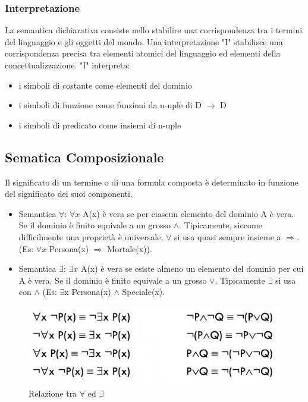 \documentclass{article}
\begin{document}
\subsubsection{Interpretazione}
La semantica dichiarativa consiste nello stabilire una corrispondenza tra i termini del linguaggio e gli oggetti del mondo. \newline
Una interpretazione "I" stabilisce una corrispondenza precisa tra elementi atomici del linguaggio ed elementi della concettualizzazione. "I" interpreta:
\begin{itemize}
    \item i simboli di costante come elementi del dominio
    \item i simboli di funzione come funzioni da n-uple di D $\rightarrow$ D
    \item i simboli di predicato come insiemi di n-uple
\end{itemize}

\subsection{Sematica Composizionale}
Il significato di un termine o di una formula composta è determinato in funzione del significato dei suoi componenti.
\begin{itemize}
    \item Semantica $\forall$:  $\forall x$ A(x) è vera se per ciascun elemento del dominio A è vera. Se il dominio è finito equivale a un grosso $\land$. Tipicamente, siccome difficilmente una proprietà è universale, $\forall$ si usa quasi sempre insieme a $\Rightarrow$. (Es: $\forall x$ Persona(x) $\Rightarrow$ Mortale(x)).
    \item Semantica $\exists$: $\exists x$ A(x) è vera se esiste almeno un elemento del dominio per cui A è vera. Se il dominio è finito equivale a un grosso $\lor$. Tipicamente $\exists$ si usa con $\land$ (Es: $\exists$x Persona(x) $\land$ Speciale(x).
\end{itemize}
\begin{figure}[H]
\centering
\includegraphics[scale=0.3]{Images/foarallexistsrelation.png}
\caption{Relazione tra $\forall$ ed $\exists$}
\end{figure}
\end{document}
